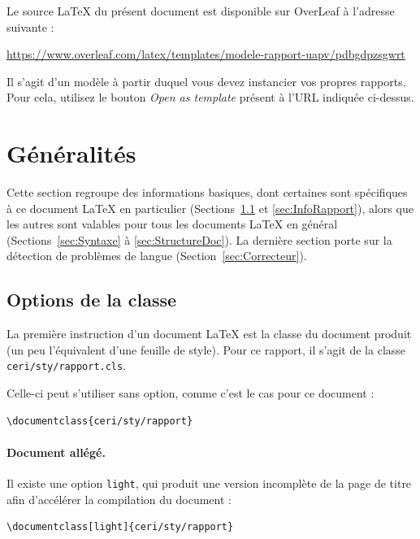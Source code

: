 \documentclass{ceri/sty/rapport}
\begin{document}
Le source \LaTeX{} du présent document est disponible sur OverLeaf à l'adresse suivante : \centerline{\url{https://www.overleaf.com/latex/templates/modele-rapport-uapv/pdbgdpzsgwrt}}
Il s'agit d'un modèle à partir duquel vous devez instancier vos propres rapports. Pour cela, utilisez le bouton \textit{Open as template} présent à l'URL indiquée ci-dessus.










\section{Généralités}
\label{sec:Generalites}
Cette section regroupe des informations basiques, dont certaines sont spécifiques à ce document \LaTeX{} en particulier (Sections~\ref{sec:OptionsClasse} et \ref{sec:InfoRapport}), alors que les autres sont valables pour tous les documents \LaTeX{} en général (Sections~\ref{sec:Syntaxe} à \ref{sec:StructureDoc}). La dernière section porte sur la détection de problèmes de langue (Section~\ref{sec:Correcteur}).


\subsection{Options de la classe}
\label{sec:OptionsClasse}
La première instruction d'un document \LaTeX{} est la classe du document produit (un peu l'équivalent d'une feuille de style). Pour ce rapport, il s'agit de la classe \texttt{ceri/sty/rapport.cls}. 

Celle-ci peut s'utiliser sans option, comme c'est le cas pour ce document :
\begin{lstlisting}[language={[LaTeX]TeX}, numbers=none]
\documentclass{ceri/sty/rapport}
\end{lstlisting}

\paragraph{Document allégé.} Il existe une option \texttt{light}, qui produit une version incomplète de la page de titre afin d'accélérer la compilation du document :
\begin{lstlisting}[language={[LaTeX]TeX}, numbers=none]
\documentclass[light]{ceri/sty/rapport}
\end{lstlisting}
\end{document}
